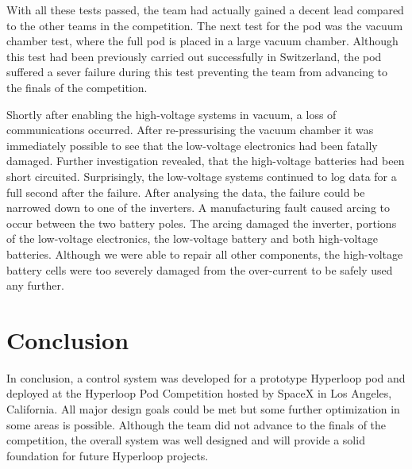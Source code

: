 With all these tests passed, the team had actually gained a decent lead compared to the other teams in the competition. The next test for the pod was the vacuum chamber test, where the full pod is placed in a large vacuum chamber. Although this test had been previously carried out successfully in Switzerland, the pod suffered a sever failure during this test preventing the team from advancing to the finals of the competition.

Shortly after enabling the high-voltage systems in vacuum, a loss of communications occurred. After re-pressurising the vacuum chamber it was immediately possible to see that the low-voltage electronics had been fatally damaged. Further investigation revealed, that the high-voltage batteries had been short circuited. Surprisingly, the low-voltage systems continued to log data for a full second after the failure. After analysing the data, the failure could be narrowed down to one of the inverters. A manufacturing fault caused arcing to occur between the two battery poles. The arcing damaged the inverter, portions of the low-voltage electronics, the low-voltage battery and both high-voltage batteries. Although we were able to repair all other components, the high-voltage battery cells were too severely damaged from the over-current to be safely used any further.

\section{Conclusion}

In  conclusion, a control system was developed for a prototype Hyperloop pod and deployed at the Hyperloop Pod Competition hosted by SpaceX in Los Angeles, California. All major design goals could be met but some further optimization in some areas is possible. Although the team did not advance to the finals of the competition, the overall system was well designed and will provide a solid foundation for future Hyperloop projects.





